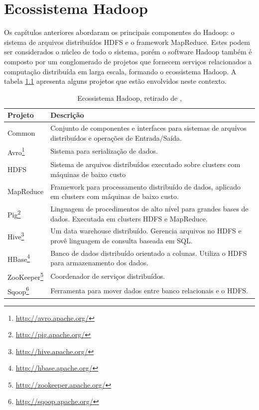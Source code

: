 \chapter{Ecossistema Hadoop}
\label{cap:eco}

Os capítulos anteriores abordaram os principais componentes do Hadoop: o sistema de arquivos distribuídos HDFS e o framework MapReduce. Estes podem ser considerados o núcleo de todo o sistema, porém o software Hadoop também é composto por um conglomerado de projetos que fornecem serviços relacionados a computação distribuída em larga escala, formando o ecossistema Hadoop. A tabela \ref{tab-eco} apresenta alguns projetos que estão envolvidos neste contexto.

\begin{savenotes}
\begin{table}[!ht]
\begin{center}
  \begin{tabular}{|p{3cm}|p{7cm}|}
	\hline
	Projeto & Descrição
	\\ \hline
	Common & Conjunto de componentes e interfaces para sistemas de arquivos distribuídos e operações de Entrada/Saída.
	\\ \hline
	Avro\footnote{\url{http://avro.apache.org/}} & Sistema para serialização de dados.
	\\ \hline
	HDFS & Sistema de arquivos distribuídos executado sobre clusters com máquinas de baixo custo
	\\ \hline
	MapReduce & Framework para processamento distribuído de dados, aplicado em clusters com máquinas de baixo custo.
	\\ \hline
	Pig\footnote{\url{http://pig.apache.org/}} & Linguagem de procedimentos de alto nível para grandes bases de dados. Executada em clusters HDFS e MapReduce.
	\\ \hline
	Hive\footnote{\url{http://hive.apache.org/}} & Um data warehouse distribuído. Gerencia arquivos no HDFS e provê linguagem de consulta baseada em SQL.
	\\ \hline
	HBase\footnote{\url{http://hbase.apache.org/}} & Banco de dados distribuído orientado a colunas. Utiliza o HDFS para armazenamento dos dados.
	\\ \hline
	ZooKeeper\footnote{\url{http://zookeeper.apache.org/}} & Coordenador de serviços distribuídos.
	\\ \hline
	Sqoop\footnote{\url{http://sqoop.apache.org/}} & Ferramenta para mover dados entre banco relacionais e o HDFS.
	\\ \hline
  \end{tabular}
  \caption{Ecossistema Hadoop, retirado de 
  , }
\label{tab-eco}
\end{center}
\end{table}
\end{savenotes}

